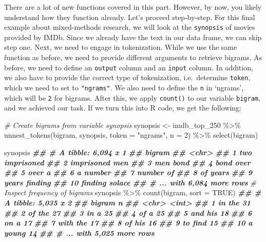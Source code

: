 \documentclass[
]{book}
\newenvironment{Shaded}{\begin{snugshade}}{\end{snugshade}}
\newcommand{\AttributeTok}[1]{\textcolor[rgb]{0.77,0.63,0.00}{#1}}
\newcommand{\CommentTok}[1]{\textcolor[rgb]{0.56,0.35,0.01}{\textit{#1}}}
\newcommand{\ConstantTok}[1]{\textcolor[rgb]{0.00,0.00,0.00}{#1}}
\newcommand{\DecValTok}[1]{\textcolor[rgb]{0.00,0.00,0.81}{#1}}
\newcommand{\DocumentationTok}[1]{\textcolor[rgb]{0.56,0.35,0.01}{\textbf{\textit{#1}}}}
\newcommand{\FunctionTok}[1]{\textcolor[rgb]{0.00,0.00,0.00}{#1}}
\newcommand{\NormalTok}[1]{#1}
\newcommand{\OtherTok}[1]{\textcolor[rgb]{0.56,0.35,0.01}{#1}}
\newcommand{\SpecialCharTok}[1]{\textcolor[rgb]{0.00,0.00,0.00}{#1}}
\newcommand{\StringTok}[1]{\textcolor[rgb]{0.31,0.60,0.02}{#1}}
\begin{document}
There are a lot of new functions covered in this part. However, by now, you likely understand how they function already. Let's proceed step-by-step. For this final example about mixed-methods research, we will look at the \texttt{synopsis} of movies provided by IMDb. Since we already have the text in our data frame, we can skip step one. Next, we need to engage in tokenization. While we use the same function as before, we need to provide different arguments to retrieve bigrams. As before, we need to define an \texttt{output} column and an \texttt{input} column. In addition, we also have to provide the correct type of tokenization, i.e.~determine \texttt{token}, which we need to set to \texttt{"ngrams"}. We also need to define the \texttt{n} in `ngrams', which will be \texttt{2} for bigrams. After this, we apply \texttt{count()} to our variable \texttt{bigram}, and we achieved our task. If we turn this into R code, we get the following:

\begin{Shaded}
\begin{Highlighting}[]
\CommentTok{\# Create bigrams from variable synopsis}
\NormalTok{synopsis }\OtherTok{\textless{}{-}}
\NormalTok{  imdb\_top\_250 }\SpecialCharTok{\%\textgreater{}\%}
  \FunctionTok{unnest\_tokens}\NormalTok{(bigram, synopsis, }\AttributeTok{token =} \StringTok{"ngrams"}\NormalTok{, }\AttributeTok{n =} \DecValTok{2}\NormalTok{) }\SpecialCharTok{\%\textgreater{}\%}
  \FunctionTok{select}\NormalTok{(bigram)}

\NormalTok{synopsis}
\DocumentationTok{\#\# \# A tibble: 6,094 x 1}
\DocumentationTok{\#\#    bigram        }
\DocumentationTok{\#\#    \textless{}chr\textgreater{}         }
\DocumentationTok{\#\#  1 two imprisoned}
\DocumentationTok{\#\#  2 imprisoned men}
\DocumentationTok{\#\#  3 men bond      }
\DocumentationTok{\#\#  4 bond over     }
\DocumentationTok{\#\#  5 over a        }
\DocumentationTok{\#\#  6 a number      }
\DocumentationTok{\#\#  7 number of     }
\DocumentationTok{\#\#  8 of years      }
\DocumentationTok{\#\#  9 years finding }
\DocumentationTok{\#\# 10 finding solace}
\DocumentationTok{\#\# \# ... with 6,084 more rows}
\CommentTok{\# Inspect frequency of bigrams}
\NormalTok{synopsis }\SpecialCharTok{\%\textgreater{}\%} \FunctionTok{count}\NormalTok{(bigram, }\AttributeTok{sort =} \ConstantTok{TRUE}\NormalTok{)}
\DocumentationTok{\#\# \# A tibble: 5,035 x 2}
\DocumentationTok{\#\#    bigram       n}
\DocumentationTok{\#\#    \textless{}chr\textgreater{}    \textless{}int\textgreater{}}
\DocumentationTok{\#\#  1 in the      31}
\DocumentationTok{\#\#  2 of the      27}
\DocumentationTok{\#\#  3 in a        25}
\DocumentationTok{\#\#  4 of a        25}
\DocumentationTok{\#\#  5 and his     18}
\DocumentationTok{\#\#  6 on a        17}
\DocumentationTok{\#\#  7 with the    17}
\DocumentationTok{\#\#  8 of his      16}
\DocumentationTok{\#\#  9 to find     15}
\DocumentationTok{\#\# 10 a young     14}
\DocumentationTok{\#\# \# ... with 5,025 more rows}
\end{Highlighting}
\end{Shaded}
\end{document}
